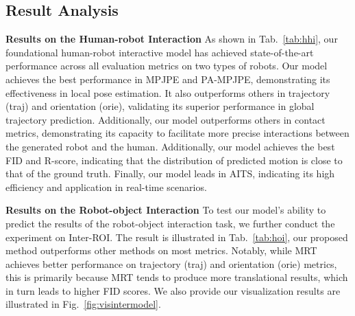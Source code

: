 
\subsection{Result Analysis}

\noindent\textbf{Results on the Human-robot Interaction}
As shown in Tab.~\ref{tab:hhi}, our foundational human-robot interactive model has achieved state-of-the-art performance across all evaluation metrics on two types of robots. 
Our model achieves the best performance in MPJPE and PA-MPJPE, demonstrating its effectiveness in local pose estimation.
It also outperforms others in trajectory (traj) and orientation (orie), validating its superior performance in global trajectory prediction.
Additionally, our model outperforms others in contact metrics, demonstrating its capacity to facilitate more precise interactions between the generated robot and the human.
Additionally, our model achieves the best FID and R-score, indicating that the distribution of predicted motion is close to that of the ground truth.
Finally, our model leads in AITS, indicating its high efficiency and application in real-time scenarios.



\noindent\textbf{Results on the Robot-object Interaction}
To test our model's ability to predict the results of the robot-object interaction task, we further conduct the experiment on Inter-ROI. The result is illustrated in Tab.~\ref{tab:hoi}, our proposed method outperforms other methods on most metrics. Notably, while MRT achieves better performance on trajectory (traj) and orientation (orie) metrics, this is primarily because MRT tends to produce more translational results, which in turn leads to higher FID scores.  We also provide our visualization results are illustrated in Fig.~\ref{fig:visintermodel}.



